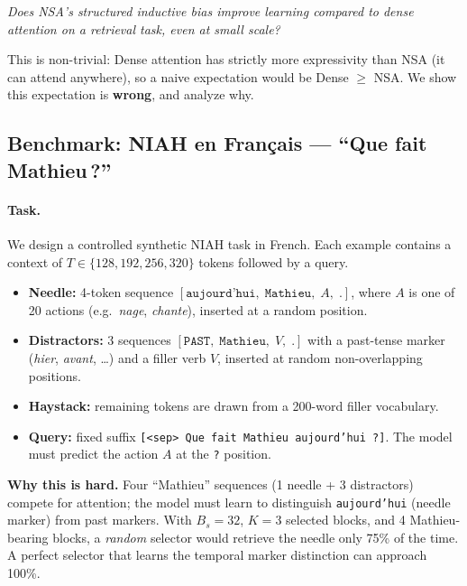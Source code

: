 \documentclass[10pt,twocolumn]{article}
\begin{document}
\begin{center}
\emph{Does NSA's structured inductive bias improve learning compared to dense\\
attention on a retrieval task, even at small scale?}
\end{center}

\noindent This is non-trivial: Dense attention has strictly more expressivity than NSA
(it can attend anywhere), so a naive expectation would be Dense $\geq$ NSA.
We show this expectation is \textbf{wrong}, and analyze why.

\subsection{Benchmark: NIAH en Français — ``Que fait Mathieu\,?''}

\paragraph{Task.}
We design a controlled synthetic NIAH task in French.
Each example contains a context of $T \in \{128, 192, 256, 320\}$ tokens followed by a query.
\begin{itemize}[leftmargin=*,noitemsep,topsep=2pt]
  \item \textbf{Needle:} 4-token sequence $[\texttt{aujourd'hui},\; \texttt{Mathieu},\; A,\; \texttt{.}]$,
        where $A$ is one of 20 actions (e.g.\ \emph{nage}, \emph{chante}), inserted at a random position.
  \item \textbf{Distractors:} 3 sequences $[\texttt{PAST},\; \texttt{Mathieu},\; V,\; \texttt{.}]$
        with a past-tense marker (\emph{hier}, \emph{avant}, \ldots)
        and a filler verb $V$, inserted at random non-overlapping positions.
  \item \textbf{Haystack:} remaining tokens are drawn from a 200-word filler vocabulary.
  \item \textbf{Query:} fixed suffix \texttt{[<sep> Que fait Mathieu aujourd'hui ?]}.
        The model must predict the action $A$ at the \texttt{?} position.
\end{itemize}

\noindent\textbf{Why this is hard.} Four ``Mathieu'' sequences (1 needle + 3 distractors)
compete for attention; the model must learn to distinguish \texttt{aujourd'hui} (needle marker)
from past markers. With $B_s=32$, $K=3$ selected blocks, and 4 Mathieu-bearing blocks,
a \emph{random} selector would retrieve the needle only 75\% of the time.
A perfect selector that learns the temporal marker distinction can approach 100\%.
\end{document}
